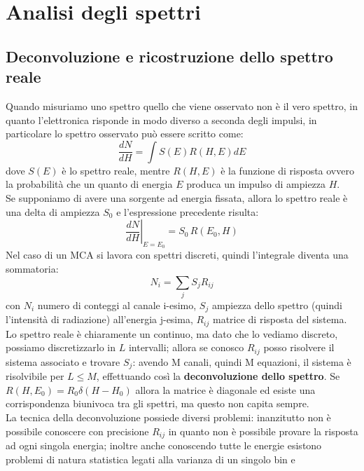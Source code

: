 \section{Analisi degli spettri}
\subsection{Deconvoluzione e ricostruzione dello spettro reale}
Quando misuriamo uno spettro quello che viene osservato non \`e il vero spettro, in quanto l'elettronica risponde in modo diverso a seconda degli impulsi,
in particolare lo spettro osservato pu\`o essere scritto come:
\begin{equation*}
\frac{dN}{dH} = \int S(E) R(H,E) dE
\end{equation*}
dove $S(E)$ \`e lo spettro reale, mentre $R(H,E)$ \`e la funzione di risposta ovvero la probabilit\`a che un quanto di energia $E$ produca un impulso di ampiezza $H$.\\
Se supponiamo di avere una sorgente ad energia fissata, allora lo spettro reale \`e una delta di ampiezza $S_0$ e l'espressione precedente risulta:
\begin{equation*}
\left.\frac{dN}{dH}\right|_{E=E_0} = S_0 \, R(E_0,H)
\end{equation*}
Nel caso di un MCA si lavora con spettri discreti, quindi l'integrale diventa una sommatoria:
\begin{equation*}
N_i = \sum_{j} S_j R_{ij}
\end{equation*}
con $N_i$ numero di conteggi al canale i-esimo, $S_j$ ampiezza dello spettro (quindi l'intensit\`a di radiazione) all'energia j-esima, $R_{ij}$ matrice di risposta del sistema.\\
Lo spettro reale \`e chiaramente un continuo, ma dato che lo vediamo discreto, possiamo discretizzarlo in $L$ intervalli;
allora se conosco $R_{ij}$ posso risolvere il sistema associato e trovare $S_j$: avendo M canali, quindi M equazioni, il sistema \`e risolvibile per $L\le M$,
effettuando cos\`i la \textbf{deconvoluzione dello spettro}.
Se $R(H,E_0) = R_0 \delta (H-H_0)$ allora la matrice \`e diagonale ed esiste una corrispondenza biunivoca tra gli spettri, ma questo non capita sempre.\\
La tecnica della deconvoluzione possiede diversi problemi: inanzitutto non \`e possibile conoscere con precisione $R_{ij}$ in quanto non \`e possibile provare
la risposta ad ogni singola energia; inoltre anche conoscendo tutte le energie esistono problemi di natura statistica legati alla varianza di un singolo bin e
